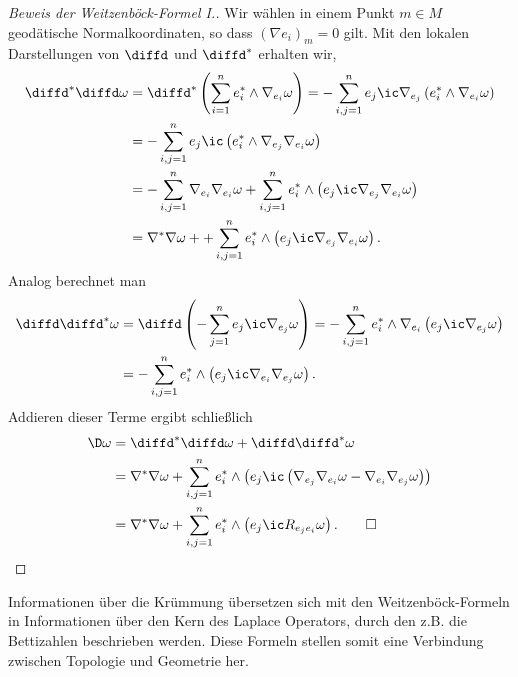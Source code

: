 \documentclass[%
	paper=a5,%
	fleqn,%
	DIV=18,%
	BCOR=0mm,
	fontsize=11pt,
	titlepage=false,%
	bibliography=totoc,
	DIV=18,%
	twoside=true,
	pdftitle=Riemannsche Geometrie,
	pdfauthor=Uwe Semmelmann,
	numbers=noendperiod]%
	{scrbook}
\begin{document}
\begin{proof}[Beweis der Weitzenböck-Formel I.]
Wir wählen in einem Punkt $m\in M$ geodätische Normalkoordinaten, so dass $(\nabla e_{i})_{m} = 0$ gilt. Mit den lokalen Darstellungen von $\diffd$ und $\diffd^*$ erhalten wir,
\begin{align*}
\diffd^*\diffd \omega &= \diffd^* \left(\sum_{i=1}^n e_{i}^* \wedge \nabla_{e_{i}}\omega\right) 
= 
-\sum_{i,j=1}^n e_{j}\ic  \nabla_{e_{j}}\left( e_{i}^* \wedge \nabla_{e_{i}}\omega\right)\\
&=
-\sum_{i,j=1}^n e_{j}\ic  \left( e_{i}^* \wedge \nabla_{e_{j}}\nabla_{e_{i}}\omega\right)\\
&=
-\sum_{i,j=1}^n \nabla_{e_{i}}\nabla_{e_{i}}\omega
+ 
\sum_{i,j=1}^n  e_{i}^* \wedge \left( e_{j} \ic \nabla_{e_{j}}\nabla_{e_{i}}\omega\right)\\
&= \nabla^*\nabla \omega + 
+ 
\sum_{i,j=1}^n  e_{i}^* \wedge \left( e_{j} \ic \nabla_{e_{j}}\nabla_{e_{i}}\omega\right).
\end{align*}
Analog berechnet man
\begin{align*}
\diffd\diffd^*\omega &= 
\diffd\left( -\sum_{j=1}^n e_{j}\ic \nabla_{e_{j}} \omega\right)
= 
 -\sum_{i,j=1}^n e_{i}^* \wedge \nabla_{e_{i}} \left(  e_{j}\ic \nabla_{e_{j}} \omega\right)\\
 &=
 -\sum_{i,j=1}^n e_{i}^* \wedge  \left(  e_{j}\ic \nabla_{e_{i}}\nabla_{e_{j}} \omega\right).
\end{align*}
Addieren dieser Terme ergibt schließlich
\begin{align*}
\D \omega &= \diffd^*\diffd\omega + \diffd\diffd^*\omega \\ 
& = \nabla^*\nabla \omega + \sum_{i,j=1}^n e_{i}^*\wedge \left(
e_{j}\ic \left(\nabla_{e_{j}}\nabla_{e_{i}}\omega - \nabla_{e_{i}}\nabla_{e_{j}}\omega\right)\right)\\
& = \nabla^*\nabla \omega + \sum_{i,j=1}^n e_{i}^*\wedge \left(
e_{j}\ic R_{e_{j}{e_{i}}}\omega\right).\qed
\end{align*}
\end{proof}

Informationen über die Krümmung übersetzen sich mit den Weitzenböck-Formeln in Informationen über den Kern des Laplace Operators, durch den z.B. die Bettizahlen beschrieben werden. Diese Formeln stellen somit eine Verbindung zwischen Topologie und Geometrie her.
\end{document}

